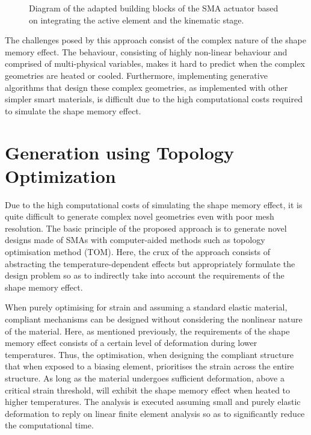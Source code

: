 \begin{figure}[hbt!] %
  \centering
  
  \caption{Diagram of the adapted building blocks of the SMA actuator based on integrating the active element and the kinematic stage.}
  \label{fig:building-blocks-at}
\end{figure}

The challenges posed by this approach consist of the complex nature of the shape memory effect. The behaviour, consisting of highly non-linear behaviour and comprised of multi-physical variables, makes it hard to predict when the complex geometries are heated or cooled. Furthermore, implementing generative algorithms that design these complex geometries, as implemented with other simpler smart materials, is difficult due to the high computational costs required to simulate the shape memory effect.

\section{Generation using Topology Optimization}
Due to the high computational costs of simulating the shape memory effect, it is quite difficult to generate complex novel geometries even with poor mesh resolution. The basic principle of the proposed approach is to generate novel designs made of SMAs with computer-aided methods such as topology optimisation method (TOM). Here, the crux of the approach consists of abstracting the temperature-dependent effects but appropriately formulate the design problem so as to indirectly take into account the requirements of the shape memory effect.

When purely optimising for strain and assuming a standard elastic material, compliant mechanisms can be designed without considering the nonlinear nature of the material. Here, as mentioned previously, the requirements of the shape memory effect consists of a certain level of deformation during lower temperatures. Thus, the optimisation, when designing the compliant structure that when exposed to a biasing element, prioritises the strain across the entire structure. As long as the material undergoes sufficient deformation, above a critical strain threshold, will exhibit the shape memory effect when heated to higher temperatures. The analysis is executed assuming small and purely elastic deformation to reply on linear finite element analysis so as to significantly reduce the computational time.

